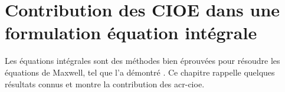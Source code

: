 \chapter{Contribution des CIOE dans une formulation équation intégrale}
\label{sec:equation_integrale}
\minitoc
\newpage
{}
Les équations intégrales sont des méthodes bien éprouvées pour résoudre les équations de Maxwell, tel que l'a démontré \cite{nedelec_acoustic_2001}. Ce chapitre rappelle quelques résultats connus et montre la contribution des \gls{acr-cioe}.



